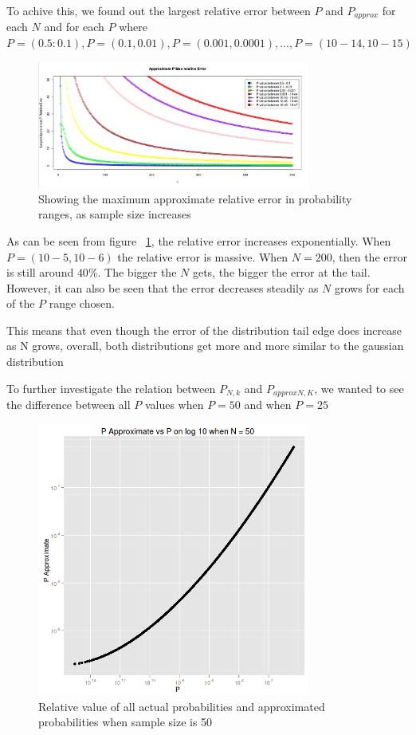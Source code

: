 \documentclass[12pt]{article}
\begin{document}
To achive this, we found out the largest relative error between $P$ and $P_{approx}$ for each $N$ and for each $P$ where $P = (0.5:0.1), P = (0.1, 0.01), P = (0.001, 0.0001), ... , P = (10-14 , 10-15)$

\begin{figure}
	\centering
  \includegraphics[width=0.8\textwidth]{LargestApproxPRelativeError3}
	\caption{Showing the maximum approximate relative error in probability ranges, as sample size increases}
	\label{fig:LargestApproxPRelativeError}
\end{figure}

As can be seen from figure ~\ref{fig:LargestApproxPRelativeError}, the relative error increases exponentially. When $P = (10-5 , 10-6)$ the relative error is massive. When $N=200$, then the error is still around $40\%$. The bigger the $N$ gets, the bigger the error at the tail. However, it can also be seen that the error decreases steadily as $N$ grows for each of the $P$ range chosen.

This means that even though the error of the distribution tail edge does increase as N grows, overall, both distributions get more and more similar to the gaussian distribution

To further investigate the relation between $P_{N, k}$ and $P_{approx N, K}$, we wanted to see the difference between all $P$ values when $P = 50$ and when $P = 25$

\begin{figure}[!h]
	\centering
  \includegraphics[width=0.8\textwidth]{PvsP50}
	\caption{Relative value of all actual probabilities and approximated probabilities when sample size is 50}
	\label{fig:PvsP50}
\end{figure}
\end{document}

